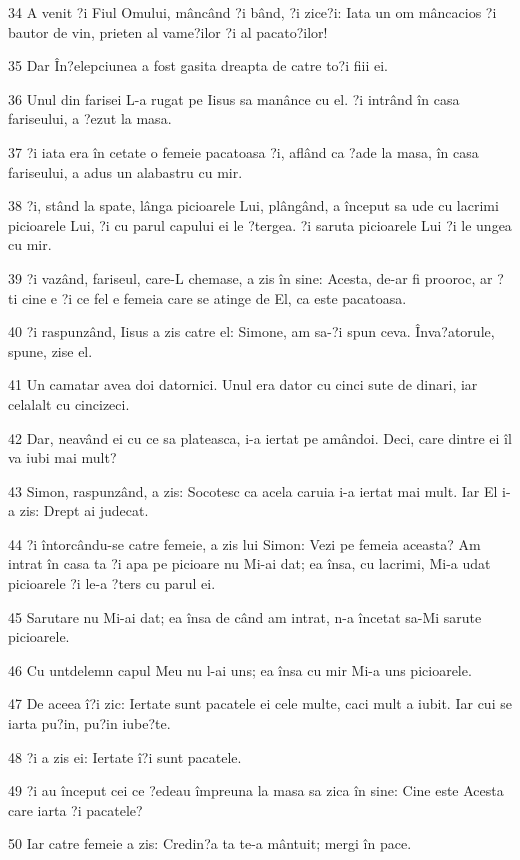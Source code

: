 \par 34 A venit ?i Fiul Omului, mâncând ?i bând, ?i zice?i: Iata un om mâncacios ?i bautor de vin, prieten al vame?ilor ?i al pacato?ilor!
\par 35 Dar În?elepciunea a fost gasita dreapta de catre to?i fiii ei.
\par 36 Unul din farisei L-a rugat pe Iisus sa manânce cu el. ?i intrând în casa fariseului, a ?ezut la masa.
\par 37 ?i iata era în cetate o femeie pacatoasa ?i, aflând ca ?ade la masa, în casa fariseului, a adus un alabastru cu mir.
\par 38 ?i, stând la spate, lânga picioarele Lui, plângând, a început sa ude cu lacrimi picioarele Lui, ?i cu parul capului ei le ?tergea. ?i saruta picioarele Lui ?i le ungea cu mir.
\par 39 ?i vazând, fariseul, care-L chemase, a zis în sine: Acesta, de-ar fi prooroc, ar ?ti cine e ?i ce fel e femeia care se atinge de El, ca este pacatoasa.
\par 40 ?i raspunzând, Iisus a zis catre el: Simone, am sa-?i spun ceva. Înva?atorule, spune, zise el.
\par 41 Un camatar avea doi datornici. Unul era dator cu cinci sute de dinari, iar celalalt cu cincizeci.
\par 42 Dar, neavând ei cu ce sa plateasca, i-a iertat pe amândoi. Deci, care dintre ei îl va iubi mai mult?
\par 43 Simon, raspunzând, a zis: Socotesc ca acela caruia i-a iertat mai mult. Iar El i-a zis: Drept ai judecat.
\par 44 ?i întorcându-se catre femeie, a zis lui Simon: Vezi pe femeia aceasta? Am intrat în casa ta ?i apa pe picioare nu Mi-ai dat; ea însa, cu lacrimi, Mi-a udat picioarele ?i le-a ?ters cu parul ei.
\par 45 Sarutare nu Mi-ai dat; ea însa de când am intrat, n-a încetat sa-Mi sarute picioarele.
\par 46 Cu untdelemn capul Meu nu l-ai uns; ea însa cu mir Mi-a uns picioarele.
\par 47 De aceea î?i zic: Iertate sunt pacatele ei cele multe, caci mult a iubit. Iar cui se iarta pu?in, pu?in iube?te.
\par 48 ?i a zis ei: Iertate î?i sunt pacatele.
\par 49 ?i au început cei ce ?edeau împreuna la masa sa zica în sine: Cine este Acesta care iarta ?i pacatele?
\par 50 Iar catre femeie a zis: Credin?a ta te-a mântuit; mergi în pace.

